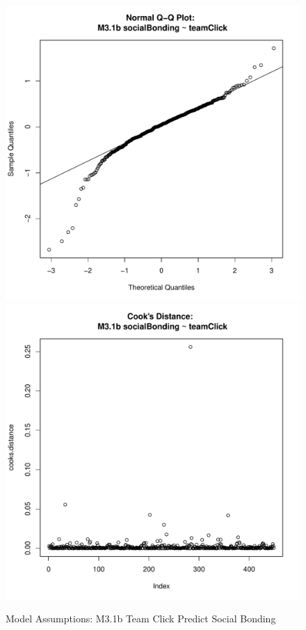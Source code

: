 \documentclass[12pt]{report}
\begin{document}
{\begin{figure}[htbp]
  \includegraphics[scale =.4]{../images/MLM31bQQNorm.pdf}
  \includegraphics[scale =.4]{../images/MLM31bCooksD.pdf}
  \caption{Model Assumptions: M3.1b Team Click Predict Social Bonding}
  \label{fig:MLM31bAssumptions}
\end{figure}


}
\end{document}
